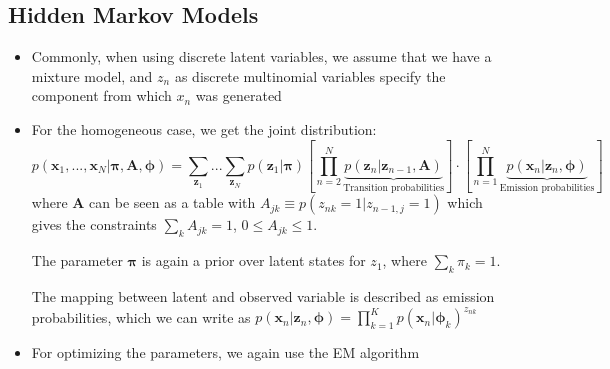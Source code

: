 \subsection{Hidden Markov Models}
\begin{itemize}
	\item Commonly, when using discrete latent variables, we assume that we have a mixture model, and $z_n$ as discrete multinomial variables specify the component from which $x_n$ was generated
	\item For the homogeneous case, we get the joint distribution:
	$$p(\bm{x}_1,...,\bm{x}_N|\bm{\pi},\bm{A},\bm{\phi}) = \sum_{\bm{z}_1}...\sum_{\bm{z}_N} p(\bm{z}_1|\bm{\pi})\left[\prod_{n=2}^{N} \underbrace{p(\bm{z}_n|\bm{z}_{n-1},\bm{A})}_{\text{Transition probabilities}}\right]\cdot \left[\prod_{n=1}^{N} \underbrace{p(\bm{x}_n|\bm{z}_n,\bm{\phi})}_{\text{Emission probabilities}}\right]$$
	where $\bm{A}$ can be seen as a table with $A_{jk}\equiv p(z_{nk}=1|z_{n-1,j}=1)$ which gives the constraints $\sum_k A_{jk}=1$, $0\leq A_{jk}\leq 1$. 
	
	The parameter $\bm{\pi}$ is again a prior over latent states for $z_1$, where $\sum_k \pi_k = 1$.
	
	The mapping between latent and observed variable is described as emission probabilities, which we can write as $p(\bm{x}_n|\bm{z}_n,\bm{\phi})=\prod_{k=1}^{K} p(\bm{x}_n|\bm{\phi}_k)^{z_{nk}}$
	
	\item For optimizing the parameters, we again use the EM algorithm
	
\end{itemize}
